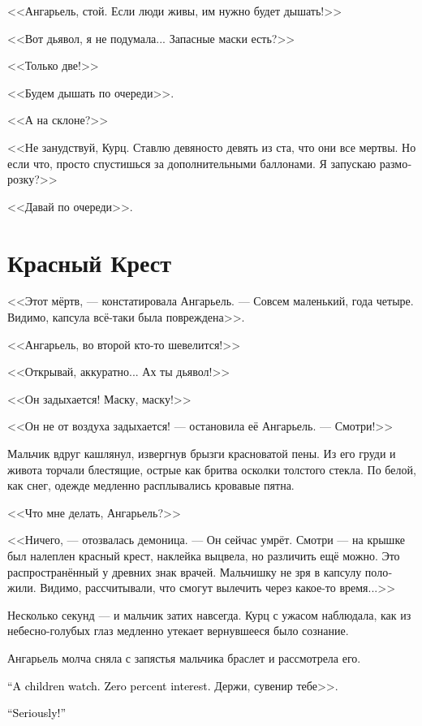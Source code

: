 \documentclass[a4paper,12pt,fleqn]{book}\usepackage{cooltooltips}\usepackage{polyglossia}\setdefaultlanguage[babelshorthands=true]{russian}\setotherlanguage{english}\defaultfontfeatures{Ligatures=TeX,Mapping=tex-text} \usepackage{xcolor}\definecolor{lightgray}{HTML}{bbbbbb}\color{lightgray}\newcommand{\ml}[3]{\textenglish{\textcolor{black}{#3}}}
\begin{document}
<<Ангарьель, стой.
Если люди живы, им нужно будет дышать!>>

<<Вот дьявол, я не подумала...
Запасные маски есть?>>

<<Только две!>>

<<Будем дышать по очереди>>.

<<А на склоне?>>

<<Не занудствуй, Курц.
Ставлю девяносто девять из ста, что они все мертвы.
Но если что, просто спустишься за дополнительными баллонами.
Я запускаю разморозку?>>

<<Давай по очереди>>.

\section{Красный Крест}

<<Этот мёртв, --- констатировала Ангарьель.
--- Совсем маленький, года четыре.
Видимо, капсула всё-таки была повреждена>>.

<<Ангарьель, во второй кто-то шевелится!>>

<<Открывай, аккуратно... Ах ты дьявол!>>

<<Он задыхается!
Маску, маску!>>

<<Он не от воздуха задыхается! --- остановила её Ангарьель.
--- Смотри!>>

Мальчик вдруг кашлянул, извергнув брызги красноватой пены.
Из его груди и живота торчали блестящие, острые как бритва осколки толстого стекла.
По белой, как снег, одежде медленно расплывались кровавые пятна.

<<Что мне делать, Ангарьель?>>

<<Ничего, --- отозвалась демоница.
--- Он сейчас умрёт.
Смотри --- на крышке был налеплен красный крест, наклейка выцвела, но различить ещё можно.
Это распространённый у древних знак врачей.
Мальчишку не зря в капсулу положили.
Видимо, рассчитывали, что смогут вылечить через какое-то время...>>

Несколько секунд --- и мальчик затих навсегда.
Курц с ужасом наблюдала, как из небесно-голубых глаз медленно утекает вернувшееся было сознание.

Ангарьель молча сняла с запястья мальчика браслет и рассмотрела его.

\ml{$0$}
{<<Детские часики.}
{``A children watch.}
\ml{$0$}
{Ничего интересного.}
{Zero percent interest.}
Держи, сувенир тебе>>.

\ml{$0$}
{<<Ты серьёзно?!>>}
{``Seriously!''}
\end{document}
